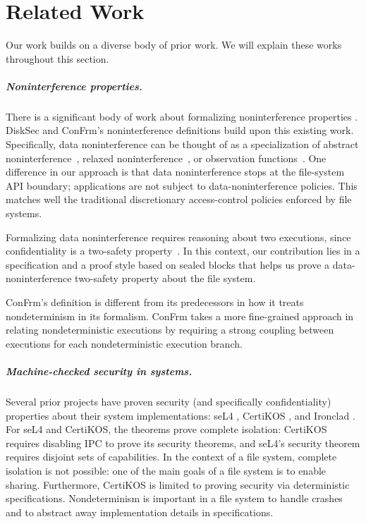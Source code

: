 \chapter{Related Work}
Our work builds on a diverse body of prior work. We will explain these works throughout this section. 

\paragraph{Noninterference properties.} There is a significant body of work about formalizing noninterference properties \cite{19, 25, 26, 29, 30, 32}. DiskSec and ConFrm’s noninterference definitions build upon this existing work. Specifically, data noninterference can be thought of as a specialization of
abstract noninterference~\cite{giacobazzi:abstract}, relaxed
noninterference~\cite{li:relaxed}, or observation
functions~\cite{costanzo:certikos-infoflow}.  One difference in our approach is that
data noninterference stops at the file-system API boundary; applications are
not subject to data-noninterference policies.  This matches well the
traditional discretionary access-control policies enforced by file systems.

Formalizing data noninterference requires reasoning about two executions, since
confidentiality is a two-safety property~\cite{terauchi:safety}.  In this
context, our contribution lies in a specification and a proof style based on
sealed blocks that helps us
prove a data-noninterference two-safety property about the file system.



ConFrm’s definition is different from its predecessors in how it treats nondeterminism in its formalism. ConFrm takes a more fine-grained approach in relating nondeterministic executions by requiring a strong coupling between executions for each nondeterministic execution branch. 

\paragraph{Machine-checked security in systems.} 
Several prior projects have proven security (and specifically confidentiality) properties about their system implementations: seL4 \cite{23, 26}, CertiKOS \cite{15}, and Ironclad \cite{20}. For seL4 and CertiKOS, the theorems prove complete isolation: CertiKOS requires disabling IPC to prove its security theorems, and seL4’s security theorem requires disjoint sets of capabilities. In the context of a file system, complete isolation is not possible: one of the main goals of a file system is to enable sharing. Furthermore, CertiKOS is limited to proving security via deterministic specifications. Nondeterminism is important in a file system to handle crashes and to abstract away implementation details in specifications. 

